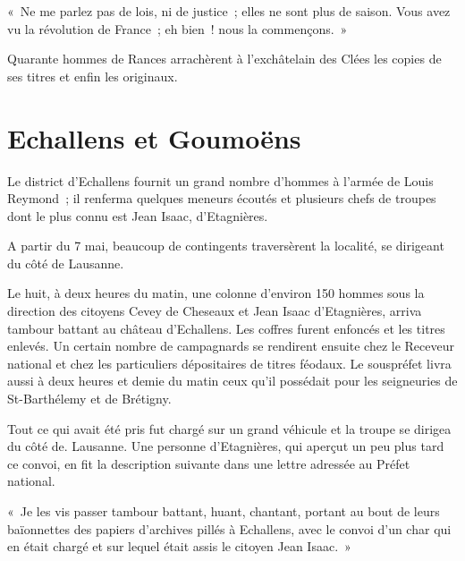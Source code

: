 \documentclass[french,twoside]{book} %
\newenvironment{quoteblock}%
  {\begin{quoting}}
  {\end{quoting}}
\newenvironment{quotebar}{%
    \def\FrameCommand{{\color{rubric!10!}\vrule width 0.5em} \hspace{0.9em}}%
    \def\OuterFrameSep{\itemsep} %
    \MakeFramed {\advance\hsize-\width \FrameRestore}
  }%
  {%
    \endMakeFramed
  }
\renewenvironment{quoteblock}%
  {%
    \savenotes
    \setstretch{0.9}
    \normalfont
    \begin{quotebar}
  }
  {%
    \end{quotebar}
    \spewnotes
  }
\begin{document}
\begin{quoteblock}
 \noindent « Ne me parlez pas de lois, ni de justice ; elles ne sont plus de saison. Vous avez vu la révolution de France ; eh bien ! nous la commençons. »
 \end{quoteblock}

\noindent Quarante hommes de Rances arrachèrent à l’exchâtelain des Clées les copies de ses titres et enfin les originaux.
\section[{Echallens et Goumoëns}]{Echallens et Goumoëns}
\noindent Le district d’Echallens fournit un grand nombre d’hommes à l’armée de Louis Reymond ; il renferma quelques meneurs écoutés et plusieurs chefs de troupes dont le plus connu est Jean Isaac, d’Etagnières.\par
A partir du 7 mai, beaucoup de contingents traversèrent la localité, se dirigeant du côté de Lausanne.\par
Le huit, à deux heures du matin, une colonne d’environ 150 hommes sous la direction des citoyens Cevey de Cheseaux et Jean Isaac d’Etagnières, arriva tambour battant au château d’Echallens. Les coffres furent enfoncés et les titres enlevés. Un certain nombre de campagnards se rendirent ensuite chez le Receveur national et chez les particuliers dépositaires de titres féodaux. Le souspréfet livra aussi à deux heures et demie du matin ceux qu’il possédait pour les seigneuries de St-Barthélemy et de Brétigny.\par
Tout ce qui avait été pris fut chargé sur un grand véhicule et la troupe se dirigea du côté de. Lausanne. Une personne d’Etagnières, qui aperçut un peu plus tard ce convoi, en fit la description suivante dans une lettre adressée au Préfet national.\par

\begin{quoteblock}
 \noindent « Je les vis passer tambour battant, huant, chantant, portant au bout de leurs baïonnettes des papiers d’archives pillés à Echallens, avec le convoi d’un char qui en était chargé et sur lequel était assis le citoyen Jean Isaac. »
 \end{quoteblock}
\end{document}
